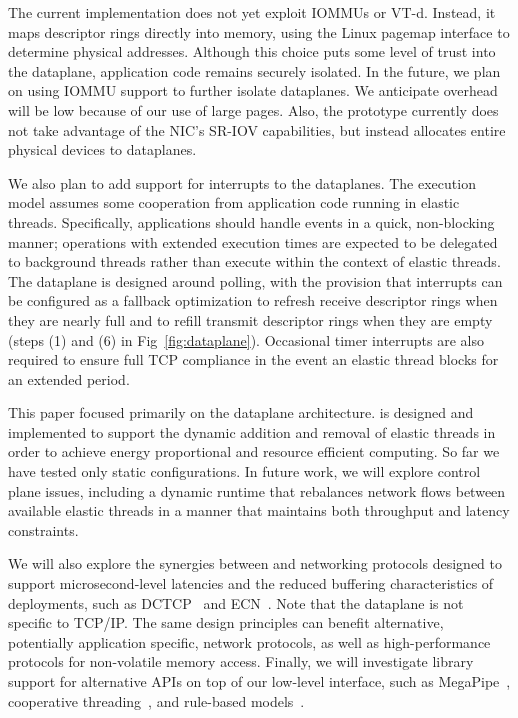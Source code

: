  The current \ix
implementation does not yet exploit IOMMUs or VT-d. Instead, it maps
descriptor rings directly into \ix memory, using the Linux pagemap
interface to determine physical addresses.  Although this choice puts
some level of trust into the \ix dataplane, application code remains
securely isolated. In the future, we plan on using IOMMU support to
further isolate \ix dataplanes. We anticipate overhead will be low
because of our use of large pages.  Also, the \ix prototype currently
does not take advantage of the NIC's SR-IOV capabilities, but instead
allocates entire physical devices to dataplanes.

We also plan to add support for interrupts to the \ix dataplanes. The
\ix execution model assumes some cooperation from application code
running in elastic threads.  Specifically, applications should handle
events in a quick, non-blocking manner; operations with extended
execution times are expected to be delegated to background threads
rather than execute within the context of elastic threads.  The \ix
dataplane is designed around polling, with the provision that
interrupts can be configured as a fallback optimization to refresh
receive descriptor rings when they are nearly full and to refill
transmit descriptor rings when they are empty (steps (1) and (6) in
Fig~\ref{fig:dataplane}). Occasional timer interrupts are also
required to ensure full TCP compliance in the event an elastic thread
blocks for an extended period.

 This paper focused primarily on the \ix
dataplane architecture. \ix is designed and implemented to support the
dynamic addition and removal of elastic threads in order to achieve
energy proportional and resource efficient computing. So far we have
tested only static configurations. In future work, we will explore
control plane issues, including a dynamic runtime that rebalances
network flows between available elastic threads in a manner that
maintains both throughput and latency constraints.

We will also explore the synergies between \ix and networking
protocols designed to support microsecond-level latencies and the
reduced buffering characteristics of \ix deployments, such as
DCTCP~\cite{DBLP:conf/sigcomm/AlizadehGMPPPSS10} and
ECN~\cite{ramakrishnan2001addition}. Note that the \ix dataplane is
not specific to TCP/IP. The same design principles can benefit
alternative, potentially application specific, network protocols, as
well as high-performance protocols for non-volatile memory
access. Finally, we will investigate library support for alternative
APIs on top of our low-level interface, such as
MegaPipe~\cite{DBLP:conf/osdi/HanMCR12}, cooperative
threading~\cite{DBLP:conf/sosp/BehrenCZNB03}, and rule-based
models~\cite{DBLP:conf/hotos/StutsmanO13}.

